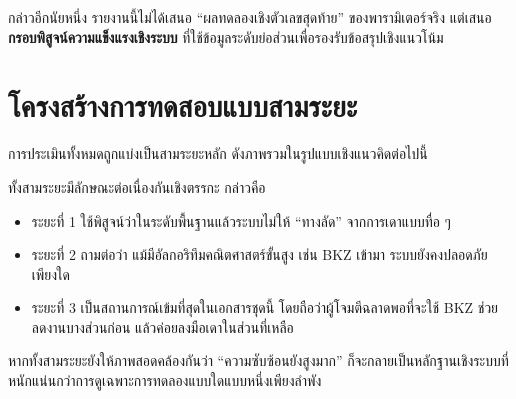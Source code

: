 \documentclass[12pt,a4paper]{article}
\newcommand{\term}[1]{\textbf{#1}}
\newcommand{\eng}[1]{\textenglish{#1}}
\begin{document}
	กล่าวอีกนัยหนึ่ง รายงานนี้ไม่ได้เสนอ ``ผลทดลองเชิงตัวเลขสุดท้าย'' ของพารามิเตอร์จริง แต่เสนอ \term{กรอบพิสูจน์ความแข็งแรงเชิงระบบ} ที่ใช้ข้อมูลระดับย่อส่วนเพื่อรองรับข้อสรุปเชิงแนวโน้ม
	
	\section{โครงสร้างการทดสอบแบบสามระยะ}
	
	การประเมินทั้งหมดถูกแบ่งเป็นสามระยะหลัก ดังภาพรวมในรูปแบบเชิงแนวคิดต่อไปนี้
	
	\begin{center}
	\end{center}
	
	ทั้งสามระยะมีลักษณะต่อเนื่องกันเชิงตรรกะ กล่าวคือ
	\begin{itemize}
		\item ระยะที่ 1 ใช้พิสูจน์ว่าในระดับพื้นฐานแล้วระบบไม่ให้ ``ทางลัด'' จากการเดาแบบทื่อ ๆ
		\item ระยะที่ 2 ถามต่อว่า แม้มีอัลกอริทึมคณิตศาสตร์ขั้นสูง เช่น \eng{BKZ} เข้ามา ระบบยังคงปลอดภัยเพียงใด
		\item ระยะที่ 3 เป็นสถานการณ์เข้มที่สุดในเอกสารชุดนี้ โดยถือว่าผู้โจมตีฉลาดพอที่จะใช้ \eng{BKZ} ช่วยลดงานบางส่วนก่อน แล้วค่อยลงมือเดาในส่วนที่เหลือ
	\end{itemize}
	
	หากทั้งสามระยะยังให้ภาพสอดคล้องกันว่า ``ความซับซ้อนยังสูงมาก'' ก็จะกลายเป็นหลักฐานเชิงระบบที่หนักแน่นกว่าการดูเฉพาะการทดลองแบบใดแบบหนึ่งเพียงลำพัง
	
\end{document}
